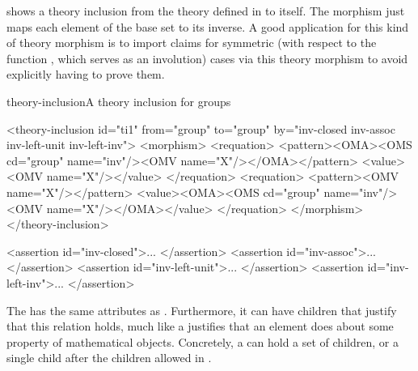 {} shows a theory inclusion from the theory
{} defined in {} to itself. The morphism just maps
each element of the base set to its inverse. A good application for this kind of
theory morphism is to import claims for symmetric (with respect to the function
{}, which serves as an involution) cases via this theory morphism to
avoid explicitly having to prove them.

\begin{myfig}{theory-inclusion}{A theory inclusion for groups}\scriptsize
\begin{boxedverbatim}
<theory-inclusion id="ti1" from="group" to="group"
  by="inv-closed inv-assoc inv-left-unit inv-left-inv">
 <morphism>
  <requation>
   <pattern><OMA><OMS cd="group" name="inv"/><OMV name="X"/></OMA></pattern>
   <value><OMV name="X"/></value>
  </requation>
  <requation>
   <pattern><OMV name="X"/></pattern>
   <value><OMA><OMS cd="group" name="inv"/><OMV name="X"/></OMA></value>
  </requation>
 </morphism>
</theory-inclusion>  

<assertion id="inv-closed">... </assertion>
<assertion id="inv-assoc">... </assertion>
<assertion id="inv-left-unit">... </assertion>
<assertion id="inv-left-inv">... </assertion>
\end{boxedverbatim}
\end{myfig}

The {} has the same attributes as
{}. Furthermore, it can have children that justify that
this relation holds, much like a {} justifies that an
{} element does about some property of mathematical objects.
Concretely, a {} can hold a set of {}
children, or a single {} child after the children allowed in
{}.

